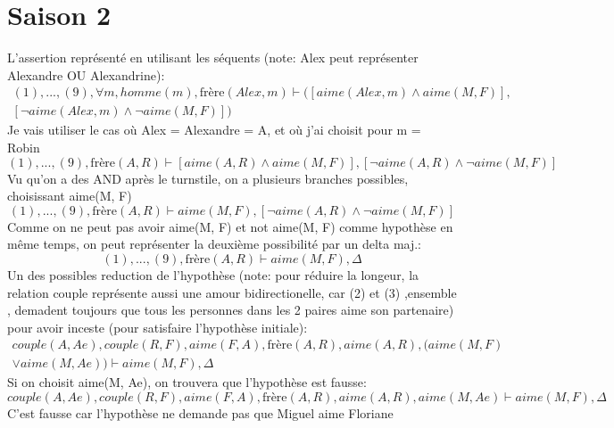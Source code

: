 \documentclass{article}
\begin{document}
\section{Saison 2}
    L'assertion représenté en utilisant les séquents (note: Alex peut représenter Alexandre OU Alexandrine):
    \begin{displaymath}
    \begin{split}
    (1), ..., (9), \forall m, homme(m), \text{frère}(Alex, m) \vdash ([aime(Alex, m) \land aime(M, F)], \\
    [\neg aime(Alex, m) \land \neg aime(M, F)])
    \end{split}
    \end{displaymath}
    Je vais utiliser le cas où Alex = Alexandre = A, et où j'ai choisit pour m = Robin
    \begin{displaymath}
    (1), ..., (9), \text{frère}(A, R) \vdash [aime(A, R) \land aime(M, F)], [\neg aime(A, R) \land \neg aime(M, F)]
    \end{displaymath}
    Vu qu'on a des AND après le turnstile, on a plusieurs branches possibles, choisissant aime(M, F) 
    \begin{displaymath}
    (1), ..., (9), \text{frère}(A, R) \vdash aime(M, F), [\neg aime(A, R) \land \neg aime(M, F)]
    \end{displaymath}
    Comme on ne peut pas avoir aime(M, F) et not aime(M, F) comme hypothèse en même temps, on peut représenter la deuxième possibilité par un delta maj.:
    \begin{displaymath}
    (1), ..., (9), \text{frère}(A, R) \vdash aime(M, F), \Delta
    \end{displaymath}
    Un des possibles reduction de l'hypothèse (note: pour réduire la longeur, la relation couple représente aussi une amour bidirectionelle, car (2) et (3) ,ensemble , demadent toujours que tous les personnes dans les 2 paires aime son partenaire) pour avoir inceste (pour satisfaire l'hypothèse initiale):
    \begin{displaymath}
    \begin{split}
    couple(A, Ae), couple(R, F), aime(F, A), \text{frère}(A, R), aime(A, R), (aime(M, F) \\
    \lor aime(M, Ae)) \vdash aime(M, F), \Delta
    \end{split}
    \end{displaymath}
    Si on choisit aime(M, Ae), on trouvera que l'hypothèse est fausse:
    \begin{displaymath}
    couple(A, Ae), couple(R, F), aime(F, A), \text{frère}(A, R), aime(A, R), aime(M, Ae) \vdash aime(M, F), \Delta
    \end{displaymath}
    C'est fausse car l'hypothèse ne demande pas que Miguel aime Floriane
\end{document}
